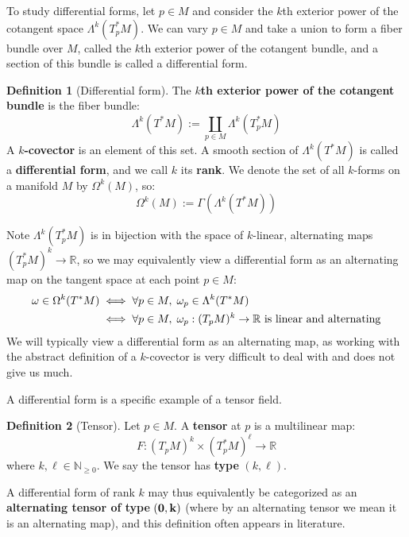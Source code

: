 \documentclass[11pt, oneside]{article}   	%
\theoremstyle{definition}
\newtheorem{definition}{Definition}[section]
\begin{document}
To study differential forms, let $p\in M$ and consider the $k$th exterior power of the cotangent space $\Lambda^k(T_p^* M)$. 
We can vary $p\in M$ and take a union to form a fiber bundle over $M$, called the $k$th exterior power of the cotangent 
bundle, and a section of this bundle is called a differential form.
\begin{definition}[Differential form]
	The \textbf{$k$th exterior power of the cotangent bundle} is the fiber bundle:
	\begin{equation}
		\Lambda^k(T^* M) := \coprod_{p\in M}\Lambda^k(T_p^* M)
	\end{equation}
	A \textbf{$k$-covector} is an element of this set. A smooth section of $\Lambda^k(T^* M)$ is called a \textbf{differential 
	form}, and we call $k$ its \textbf{rank}. We denote the set of all $k$-forms on a manifold $M$ by $\Omega^k(M)$, so:
	\begin{equation}
		\Omega^k(M) := \Gamma\left(\Lambda^k(T^* M)\right)
	\end{equation}
\end{definition}
Note $\Lambda^k(T_p^* M)$ is in bijection with the space of $k$-linear, alternating maps $(T_p^* M)^k\rightarrow\mathbb R$, 
so we may equivalently view a differential form as an alternating map on the tangent space at each point $p\in M$:
\begin{align}
	\omega\in\Omega^k(T^*M) &\iff\forall p\in M, \;\omega_p\in\Lambda^k(T^*M) \\
	&\iff\forall p\in M, \;\omega_p : (T_p M)^k\rightarrow \mathbb R\textnormal{ is linear and alternating}
\end{align}
We will typically view a differential form as an alternating map, as working with the abstract definition of a $k$-covector 
is very difficult to deal with and does not give us much. 

A differential form is a specific example of a tensor field.
\begin{definition}[Tensor]
	Let $p\in M$. A \textbf{tensor} at $p$ is a multilinear map:
	\begin{equation}
		F : (T_p M)^k\times (T_p^* M)^\ell\rightarrow\mathbb R
	\end{equation}
	where $k, \ell\in\mathbb N_{\geq 0}$. We say the tensor has \textbf{type} $(k, \ell)$. 
\end{definition}
A differential form of rank $k$ may thus equivalently be categorized as an \textbf{alternating tensor of type} $\bf{(0, k)}$ (where 
by an alternating tensor we mean it is an alternating map), and this definition often appears in literature. 
\end{document}
